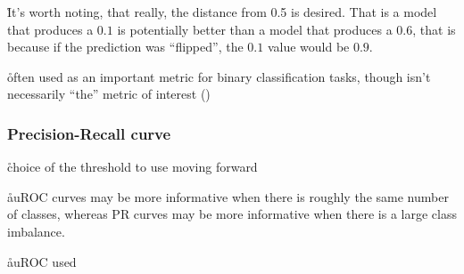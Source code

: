 \r{It's worth noting, that really, the distance from 0.5 is desired. That is a model that produces a $0.1$ is potentially better than a model that produces a $0.6$, that is because if the prediction was ``flipped'', the $0.1$ value would be $0.9$.}

\r{often used as an important metric for binary classification tasks, though isn't necessarily ``the'' metric of interest ()}


\subsubsection{Precision-Recall curve}


\r{choice of the threshold to use moving forward}

\r{auROC curves may be more informative when there is roughly the same number of classes, whereas PR curves may be more informative when there is a large class imbalance.\cite{davis2006relationship}}

\r{auROC \ALR used}